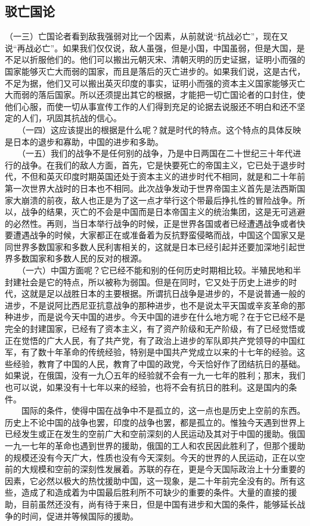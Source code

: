 \documentclass[cn,11pt,chinese]{elegantbook}
\def\myformat#1{\hfil\hfil #1}
\begin{document}
\subsection*{\myformat{驳亡国论}}
（一三）亡国论者看到敌我强弱对比一个因素，从前就说“抗战必亡”，现在又说“再战必亡”。如果我们仅仅说，敌人虽强，但是小国，中国虽弱，但是大国，是不足以折服他们的。他们可以搬出元朝灭宋、清朝灭明的历史证据，证明小而强的国家能够灭亡大而弱的国家，而且是落后的灭亡进步的。如果我们说，这是古代，不足为据，他们又可以搬出英灭印度的事实，证明小而强的资本主义国家能够灭亡大而弱的落后国家。所以还须提出其它的根据，才能把一切亡国论者的口封住，使他们心服，而使一切从事宣传工作的人们得到充足的论据去说服还不明白和还不坚定的人们，巩固其抗战的信心。\\
　　（一四）这应该提出的根据是什么呢？就是时代的特点。这个特点的具体反映是日本的退步和寡助，中国的进步和多助。\\
　　（一五）我们的战争不是任何别的战争，乃是中日两国在二十世纪三十年代进行的战争。在我们的敌人方面，首先，它是快要死亡的帝国主义，它已处于退步时代，不但和英灭印度时期英国还处于资本主义的进步时代不相同，就是和二十年前第一次世界大战时的日本也不相同。此次战争发动于世界帝国主义首先是法西斯国家大崩溃的前夜，敌人也正是为了这一点才举行这个带最后挣扎性的冒险战争。所以，战争的结果，灭亡的不会是中国而是日本帝国主义的统治集团，这是无可逃避的必然性。再则，当日本举行战争的时候，正是世界各国或者已经遭遇战争或者快要遭遇战争的时候，大家都正在或准备着为反抗野蛮侵略而战，中国这个国家又是同世界多数国家和多数人民利害相关的，这就是日本已经引起并还要加深地引起世界多数国家和多数人民的反对的根源。\\
　　（一六）中国方面呢？它已经不能和别的任何历史时期相比较。半殖民地和半封建社会是它的特点，所以被称为弱国。但是在同时，它又处于历史上进步的时代，这就是足以战胜日本的主要根据。所谓抗日战争是进步的，不是说普通一般的进步，不是说阿比西尼亚抗意战争的那种进步，也不是说太平天国或辛亥革命的那种进步，而是说今天中国的进步。今天中国的进步在什么地方呢？在于它已经不是完全的封建国家，已经有了资本主义，有了资产阶级和无产阶级，有了已经觉悟或正在觉悟的广大人民，有了共产党，有了政治上进步的军队即共产党领导的中国红军，有了数十年革命的传统经验，特别是中国共产党成立以来的十七年的经验。这些经验，教育了中国的人民，教育了中国的政党，今天恰好作了团结抗日的基础。如果说，在俄国，没有一九〇五年的经验就不会有一九一七年的胜利；那末，我们也可以说，如果没有十七年以来的经验，也将不会有抗日的胜利。这是国内的条件。\\
　　国际的条件，使得中国在战争中不是孤立的，这一点也是历史上空前的东西。历史上不论中国的战争也罢，印度的战争也罢，都是孤立的。惟独今天遇到世界上已经发生或正在发生的空前广大和空前深刻的人民运动及其对于中国的援助。俄国一九一七年的革命也遇到世界的援助，俄国的工人和农民因此胜利了，但那个援助的规模还没有今天广大，性质也没有今天深刻。今天的世界的人民运动，正在以空前的大规模和空前的深刻性发展着。苏联的存在，更是今天国际政治上十分重要的因素，它必然以极大的热忱援助中国，这一现象，是二十年前完全没有的。所有这些，造成了和造成着为中国最后胜利所不可缺少的重要的条件。大量的直接的援助，目前虽然还没有，尚有待于来日，但是中国有进步和大国的条件，能够延长战争的时间，促进并等候国际的援助。\\
\end{document}

